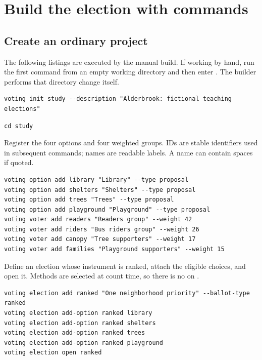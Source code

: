 \chapter{Build the election with commands}
\label{chap:project}
\section{Create an ordinary project}
The following listings are executed by the manual build. If working by hand, run the first command from an empty working directory and then enter . The builder performs that directory change itself.
\begin{lstlisting}[style=votingrun]
voting init study --description "Alderbrook: fictional teaching elections"
\end{lstlisting}
\begin{lstlisting}
cd study
\end{lstlisting}
Register the four options and four weighted groups. IDs are stable identifiers used in subsequent commands; names are readable labels. A name can contain spaces if quoted.
\begin{lstlisting}[style=votingrun]
voting option add library "Library" --type proposal
voting option add shelters "Shelters" --type proposal
voting option add trees "Trees" --type proposal
voting option add playground "Playground" --type proposal
voting voter add readers "Readers group" --weight 42
voting voter add riders "Bus riders group" --weight 26
voting voter add canopy "Tree supporters" --weight 17
voting voter add families "Playground supporters" --weight 15
\end{lstlisting}
Define an election whose instrument is ranked, attach the eligible choices, and open it. Methods are selected at count time, so there is no  on .
\begin{lstlisting}[style=votingrun]
voting election add ranked "One neighborhood priority" --ballot-type ranked
voting election add-option ranked library
voting election add-option ranked shelters
voting election add-option ranked trees
voting election add-option ranked playground
voting election open ranked
\end{lstlisting}

